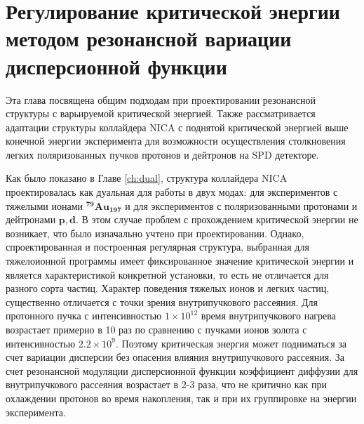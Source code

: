 
	\chapter{Регулирование критической энергии методом резонансной вариации дисперсионной функции}\label{ch:resonant}

\par Эта глава посвящена общим подходам при проектировании резонансной структуры с варьируемой критической энергией. Также рассматривается адаптации структуры коллайдера NICA с поднятой критической энергией выше конечной энергии эксперимента для возможности осуществления столкновения легких поляризованных пучков протонов и дейтронов на SPD детекторе.

\begin{comment}
В эксперименте по столкновению тяжелых ионов золота c максимальной энергией $E_{exp}=4.5$ ГэВ/нуклон критическая энергия магнитооптической структуры коллайдера составляет $E_{tr}^{Au-Au}=5.7$\ ГэВ ($\gamma_{tr}^{Au-Au}=7.1$). Такое значение критической энергии было достигнуто выбором частоты бетатронных колебаний в горизонтальной плоскости $\nu_x\approx\gamma_{tr}^{Au}>\gamma_{max}^{Au}\approx7.1$, которая  при условии регулярности структуры арок, состоящих из одинаковых ячеек ФОДО, должна быть больше максимального значения фактора Лоренца во всем интервале энергий.
\end{comment}

\par Как было показано в Главе \ref{ch:dual}, структура коллайдера NICA проектировалась как дуальная для работы в двух модах: для экспериментов с тяжелыми ионами $^{\mathbf{79}}{\mathbf{Au}}_{\mathbf{197}}$ и для экспериментов с поляризованными протонами и дейтронами $\mathbf{p, d}$. В этом случае проблем с прохождением критической энергии не возникает, что было изначально учтено при проектировании. Однако, спроектированная и построенная регулярная структура, выбранная для тяжелоионной программы имеет фиксированное значение критической энергии и является характеристикой конкретной установки, то есть не отличается для разного сорта частиц. Характер поведения тяжелых ионов и легких частиц, существенно отличается с точки зрения внутрипучкового рассеяния. Для протонного пучка с интенсивностью $1\times10^{12}$ время внутрипучкового нагрева возрастает примерно в 10 раз по сравнению с пучками ионов золота с интенсивностью $2.2\times10^{9}$. Поэтому критическая энергия может подниматься за счет вариации дисперсии без опасения влияния внутрипучкового рассеяния. За счет резонансной модуляции дисперсионной функции коэффициент диффузии для внутрипучкового рассеяния возрастает в 2-3 раза, что не критично как при охлаждении протонов во время накопления, так и при их группировке на энергии эксперимента.

